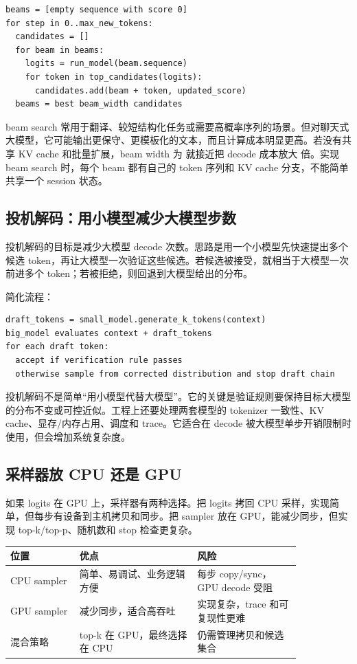 \begin{lstlisting}[numbers=none,caption={beam search 伪代码}]
beams = [empty sequence with score 0]
for step in 0..max_new_tokens:
  candidates = []
  for beam in beams:
    logits = run_model(beam.sequence)
    for token in top_candidates(logits):
      candidates.add(beam + token, updated_score)
  beams = best beam_width candidates
\end{lstlisting}

beam search 常用于翻译、较短结构化任务或需要高概率序列的场景。但对聊天式大模型，它可能输出更保守、更模板化的文本，而且计算成本明显更高。若没有共享 KV cache 和批量扩展，beam width 为  就接近把 decode 成本放大  倍。实现 beam search 时，每个 beam 都有自己的 token 序列和 KV cache 分支，不能简单共享一个 session 状态。

\subsection{投机解码：用小模型减少大模型步数}

投机解码的目标是减少大模型 decode 次数。思路是用一个小模型先快速提出多个候选 token，再让大模型一次验证这些候选。若候选被接受，就相当于大模型一次前进多个 token；若被拒绝，则回退到大模型给出的分布。

简化流程：

\begin{lstlisting}[numbers=none,caption={投机解码简化流程}]
draft_tokens = small_model.generate_k_tokens(context)
big_model evaluates context + draft_tokens
for each draft token:
  accept if verification rule passes
  otherwise sample from corrected distribution and stop draft chain
\end{lstlisting}

投机解码不是简单“用小模型代替大模型”。它的关键是验证规则要保持目标大模型的分布不变或可控近似。工程上还要处理两套模型的 tokenizer 一致性、KV cache、显存/内存占用、调度和 trace。它适合在 decode 被大模型单步开销限制时使用，但会增加系统复杂度。

\subsection{采样器放 CPU 还是 GPU}

如果 logits 在 GPU 上，采样器有两种选择。把 logits 拷回 CPU 采样，实现简单，但每步有设备到主机拷贝和同步。把 sampler 放在 GPU，能减少同步，但实现 top-k/top-p、随机数和 stop 检查更复杂。

\begin{center}
\begin{tabular}{p{0.20\linewidth}p{0.34\linewidth}p{0.30\linewidth}}
\toprule
位置 & 优点 & 风险 \\
\midrule
CPU sampler & 简单、易调试、业务逻辑方便 & 每步 copy/sync，GPU decode 受阻 \\
GPU sampler & 减少同步，适合高吞吐 & 实现复杂，trace 和可复现性更难 \\
混合策略 & top-k 在 GPU，最终选择在 CPU & 仍需管理拷贝和候选集合 \\
\bottomrule
\end{tabular}
\end{center}


